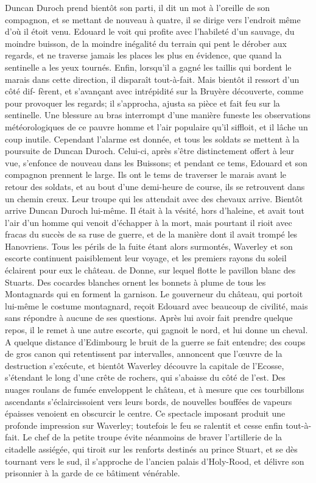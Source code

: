 {Duncan Duroch prend bientôt son parti, il dit un mot à l'oreille de son compagnon, et se mettant de nouveau à quatre, il se dirige vers l'endroit même d'où il étoit venu. Edouard le voit qui profite avec l'habileté d'un sauvage, du moindre buisson, de la moindre inégalité du terrain qui pent le dérober aux regards, et ne traverse jamais les places les plus en évidence, que quand la sentinelle a les yeux tournés. Enfin, lorsqu'il a gagné les taillis qui bordent le marais dans cette direction, il disparaît tout-à-fait. Mais bientôt il ressort d'un côté dif-\setcounter{page}{223} fèrent, et s'avançant avec intrépidité sur la Bruyère découverte, comme pour provoquer les regards; il s'approcha, ajusta sa pièce et fait feu sur la sentinelle. Une blessure au bras interrompt d'une manière funeste les observations météorologiques de ce pauvre homme et l'air populaire qu'il siffloit, et il lâche un coup inutile. Cependant l'alarme est donnée, et tous les soldats se mettent à la poursuite de Duncan Duroch. Celui-ci, après s'être distinctement offert à leur vue, s'enfonce de nouveau dans les Buissons; et pendant ce tems, Edouard et son compagnon prennent le large. Ils ont le tems de traverser le marais avant le retour des soldats, et au bout d'une demi-heure de course, ils se retrouvent dans un chemin creux. Leur troupe qui les attendait avec des chevaux arrive. Bientôt arrive Duncan Duroch lui-même. Il était à la vésité, hors d'haleine, et avait tout l'air d'un homme qui venoit d'échapper à la mort, mais pourtant il rioit avec fracas du succès de sa ruse de guerre, et de la manière dont il avait trompé les Hanovriens.
Tous les périls de la fuite étant alors surmontés, Waverley et son escorte continuent paisiblement leur voyage, et les premiers rayons du soleil éclairent pour eux le château.\setcounter{page}{224} de Donne, sur lequel flotte le pavillon blanc des Stuarts. Des cocardes blanches ornent les bonnets à plume de tous les Montagnards qui en forment la garnison. Le gouverneur du château, qui portoit lui-même le costume montagnard, reçoit Edouard avec beaucoup de civilité, mais sans répondre à aucune de ses questions.
Après lui avoir fait prendre quelque repos, il le remet à une autre escorte, qui gagnoit le nord, et lui donne un cheval. A quelque distance d'Edimbourg le bruit de la guerre se fait entendre; des coups de gros canon qui retentissent par intervalles, annoncent que l'œuvre de la destruction s'exécute, et bientôt Waverley découvre la capitale de l'Ecosse, s'étendant le long d'une crête de rochers, qui s'abaisse du côté de l'est. Des nuages roulans de fumée enveloppent le château, et à mesure que ces tourbillons ascendants s'éclaircissoient vers leurs bords, de nouvelles bouffées de vapeurs épaisses venoient en obscurcir le centre. Ce spectacle imposant produit une profonde impression sur Waverley; toutefois le feu se ralentit et cesse enfin tout-à-fait. Le chef de la petite troupe évite néanmoins de braver l'artillerie de la citadelle assiégée, qui tiroit sur les renforts destinés au prince Stuart, et se dès\setcounter{page}{225} tournant vers le sud, il s'approche de l'ancien palais d'Holy-Rood, et délivre son prisonnier à la garde de ce bâtiment vénérable.
}
